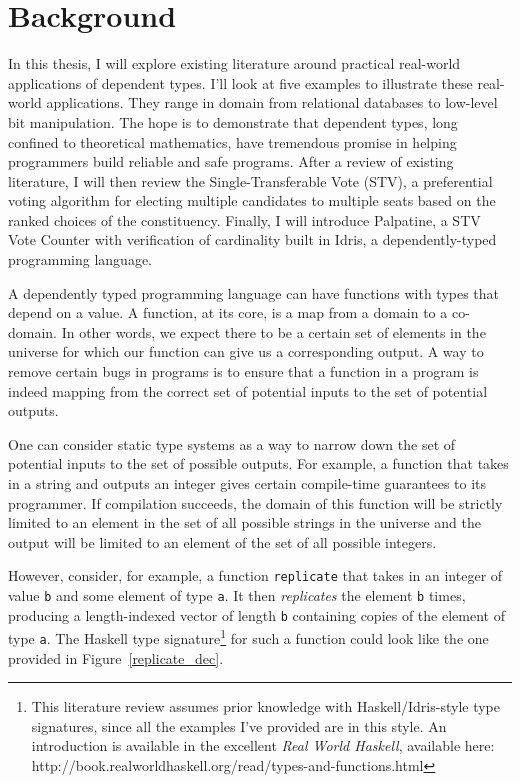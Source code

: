 \section{Background}
In this thesis, I will explore existing literature around practical real-world
applications of dependent types. I'll look at five examples to illustrate these
real-world applications. They range in domain from relational databases to
low-level bit manipulation. The hope is to demonstrate that dependent types,
long confined to theoretical mathematics, have tremendous promise in helping
programmers build reliable and safe programs. After a review of existing
literature, I will then review the Single-Transferable Vote (STV), a
preferential voting algorithm for electing multiple candidates to multiple seats
based on the ranked choices of the constituency. Finally, I will introduce
Palpatine, a STV Vote Counter with verification of cardinality built in
Idris, a dependently-typed programming language. 

A dependently typed programming language can have functions with types that
depend on a value. A function, at its core, is a map from a domain to a
co-domain. In other words, we expect there to be a certain set of elements in
the universe for which our function can give us a corresponding output. A way to
remove certain bugs in programs is to ensure that a function in a program is
indeed mapping from the correct set of potential inputs to the set of potential
outputs. 

One can consider static type systems as a way to narrow down the set of
potential inputs to the set of possible outputs. For example, a function that
takes in a string and outputs an integer gives certain compile-time guarantees
to its programmer. If compilation succeeds, the domain of this function will be
strictly limited to an element in the set of all possible strings in the
universe and the output will be limited to an element of the set of all possible
integers. 

However, consider, for example, a function \texttt{replicate} that takes in an
integer of value \texttt{b} and some element of type \texttt{a}. It then
\textit{replicates} the element \texttt{b} times, producing a length-indexed
vector of length \texttt{b} containing copies of the element of type \texttt{a}.
The Haskell type signature\footnote{This literature review assumes prior
knowledge with Haskell/Idris-style type signatures, since all the examples I've
provided are in this style. An introduction is available in the excellent
\textit{Real World Haskell}, available here:
http://book.realworldhaskell.org/read/types-and-functions.html} for such a
function could look like the one provided in Figure~\ref{replicate_dec}.

